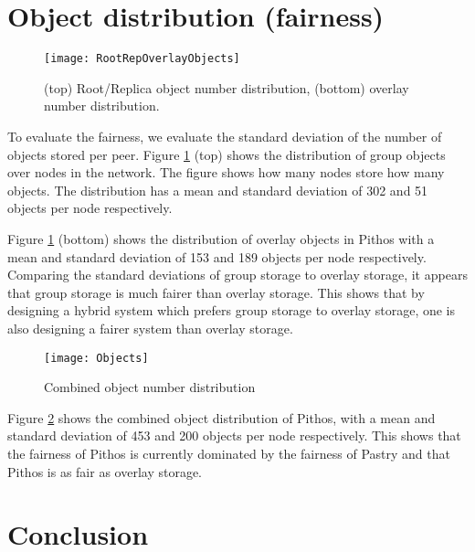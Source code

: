 \section{Object distribution (fairness)}

\begin{figure}[htbp]
 \centering
 \texttt{[image: RootRepOverlayObjects]}
 \caption{(top) Root/Replica object number distribution, (bottom) overlay number distribution.}
 \label{fig_group_overlay_objects}
\end{figure}
%
To evaluate the fairness, we evaluate the standard deviation of the number of objects stored per peer. Figure \ref{fig_group_overlay_objects} (top) shows the distribution of group objects over nodes in the network. The figure shows how many nodes store how many objects. The distribution has a mean and standard deviation of 302 and 51 objects per node respectively.

Figure \ref{fig_group_overlay_objects} (bottom) shows the distribution of overlay objects in Pithos with a mean and standard deviation of 153 and 189 objects per node respectively. Comparing the standard deviations of group storage to overlay storage, it appears that group storage is much fairer than overlay storage. This shows that by designing a hybrid system which prefers group storage to overlay storage, one is also designing a fairer system than overlay storage.

\begin{figure}[htbp]
 \centering
 \texttt{[image: Objects]}
 \caption{Combined object number distribution}
 \label{fig_objects}
\end{figure}
%
Figure \ref{fig_objects} shows the combined object distribution of Pithos, with a mean and standard deviation of 453 and 200 objects per node respectively. This shows that the fairness of Pithos is currently dominated by the fairness of Pastry and that Pithos is as fair as overlay storage.

\section{Conclusion}
